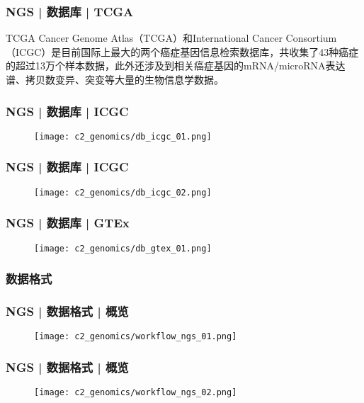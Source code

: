 \begin{frame}
  \frametitle{NGS | 数据库 | TCGA}
  \begin{block}{TCGA}
Cancer Genome Atlas（TCGA）和International Cancer Consortium（ICGC）是目前国际上最大的两个癌症基因信息检索数据库，共收集了43种癌症的超过13万个样本数据，此外还涉及到相关癌症基因的mRNA/microRNA表达谱、拷贝数变异、突变等大量的生物信息学数据。
  \end{block}
\end{frame}

\begin{frame}
  \frametitle{NGS | 数据库 | ICGC}
  \begin{figure}
    \centering
    \texttt{[image: c2\_genomics/db\_icgc\_01.png]}
  \end{figure}
\end{frame}

\begin{frame}
  \frametitle{NGS | 数据库 | ICGC}
  \begin{figure}
    \centering
    \texttt{[image: c2\_genomics/db\_icgc\_02.png]}
  \end{figure}
\end{frame}

\begin{frame}
  \frametitle{NGS | 数据库 | GTEx}
  \begin{figure}
    \centering
    \texttt{[image: c2\_genomics/db\_gtex\_01.png]}
  \end{figure}
\end{frame}

\subsubsection{数据格式}
\begin{frame}
  \frametitle{NGS | 数据格式 | 概览}
  \begin{figure}
    \centering
    \texttt{[image: c2\_genomics/workflow\_ngs\_01.png]}
  \end{figure}
\end{frame}

\begin{frame}
  \frametitle{NGS | 数据格式 | 概览}
  \begin{figure}
    \centering
    \texttt{[image: c2\_genomics/workflow\_ngs\_02.png]}
  \end{figure}
\end{frame}

